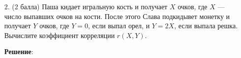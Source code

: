 \documentclass{article}
\begin{document}
\begin{enumerate}





\item[2.] (2 балла) Паша кидает игральную кость и получает $X$ очков, где $X$ — число выпавших очков на кости. После этого Слава подкидывет монетку и получает $Y$ очков, где $Y = 0$, если выпал орел, и $Y = 2X$, если выпала решка. Вычислите коэффициент корреляции $r(X, Y)$.

\textbf{Решение}:


\end{enumerate}
\end{document}

